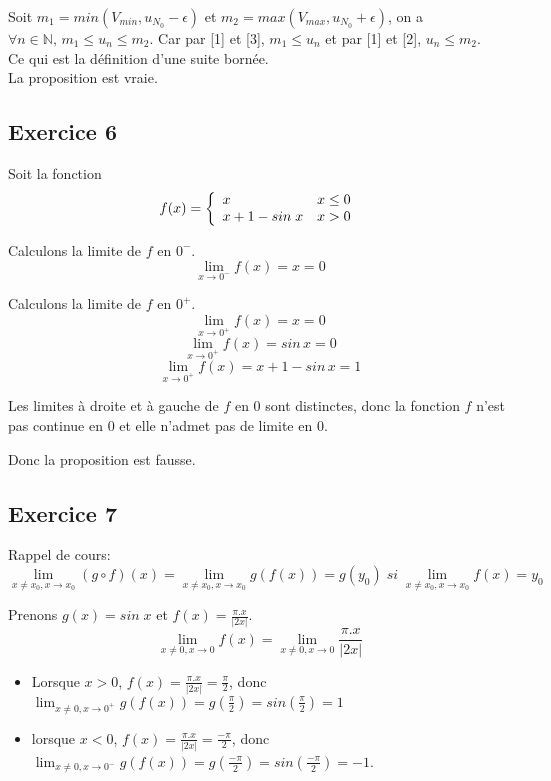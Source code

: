 \documentclass[]{book}
\theoremstyle{definition}
\newcommand{\bb}[1]{\mathbb{#1}}
\newcommand{\N}{\bb{N}}
\begin{document}
Soit $m_1 = min(V_{min}, u_{N_0}-\epsilon)$ et $m_2=max(V_{max}, u_{N_0}+\epsilon)$, on a $\forall n \in \N,\, m_1 \le u_n \le m_2$. Car par [1] et [3], $m_1 \le u_n$ et par [1] et [2], $u_n \le m_2$.  \\
Ce qui est la d\'efinition d'une suite born\'ee.\\


La proposition est vraie.


\subsection*{Exercice 6}
Soit la fonction 
$$f(x) = 
\left\{ 
\begin{array}{l l}
 x &  x \le 0\\
 x+1-sin\; x & x > 0\\
\end{array}
\right. 
$$

Calculons la limite de $f$ en $0^-$.
$$\lim_{x \to 0^-} f(x) = x = 0$$

Calculons la limite de $f$ en $0^+$.
$$\lim_{x \to 0^+} f(x) = x = 0$$
$$\lim_{x \to 0^+} f(x) = sin\, x = 0$$
$$\lim_{x \to 0^+} f(x) = x +1 - sin\, x = 1$$


Les limites \`a droite et \`a gauche de $f$ en $0$ sont distinctes, donc la fonction $f$ n'est pas continue en $0$ et elle n'admet pas de limite en $0$.

Donc la proposition est fausse.


\subsection*{Exercice 7}
Rappel de cours:
$$\lim_{x \neq x_0, x \to x_0}(g \circ f)(x) = \lim_{x \neq x_0, x \to x_0}g(f(x)) = g(y_0)\; si\; \lim_{x \neq x_0, x \to x_0} f(x) = y_0 $$

Prenons $g(x) = sin\; x$ et $f(x) = \frac{\pi.x}{|2x|}$. 
$$ \lim_{x \neq 0, x \to 0} f(x) = \lim_{x \neq 0, x \to 0} \frac{\pi.x}{|2x|}$$
\begin{itemize}
\item Lorsque $x>0$, $f(x) = \frac{\pi.x}{|2x|} = \frac{\pi}{2}$, donc $\lim_{x \neq 0, x \to 0^{+}} g(f(x)) = g(\frac{\pi}{2}) = sin(\frac{\pi}{2}) = 1$ 
\item lorsque $x<0$, $f(x) = \frac{\pi.x}{|2x|} = \frac{-\pi}{2}$, donc $\lim_{x \neq 0, x \to 0^{-}} g(f(x)) = g(\frac{-\pi}{2}) = sin(\frac{-\pi}{2}) = -1$.
\end{itemize}
\end{document}
